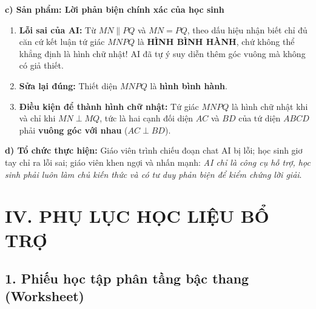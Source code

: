 \documentclass[12pt, a4paper]{article}
\begin{document}
\noindent \textbf{c) Sản phẩm: Lời phản biện chính xác của học sinh}
\begin{enumerate}[leftmargin=0.6cm]
    \item \textbf{Lỗi sai của AI:} Từ $MN \parallel PQ$ và $MN = PQ$, theo dấu hiệu nhận biết chỉ đủ căn cứ kết luận tứ giác $MNPQ$ là \textbf{HÌNH BÌNH HÀNH}, chứ không thể khẳng định là hình chữ nhật! AI đã tự ý suy diễn thêm góc vuông mà không có giả thiết.
    \item \textbf{Sửa lại đúng:} Thiết diện $MNPQ$ là \textbf{hình bình hành}.
    \item \textbf{Điều kiện để thành hình chữ nhật:} Tứ giác $MNPQ$ là hình chữ nhật khi và chỉ khi $MN \perp MQ$, tức là hai cạnh đối diện $AC$ và $BD$ của tứ diện $ABCD$ phải \textbf{vuông góc với nhau} ($AC \perp BD$).
\end{enumerate}

\noindent \textbf{d) Tổ chức thực hiện:}
Giáo viên trình chiếu đoạn chat AI bị lỗi; học sinh giơ tay chỉ ra lỗi sai; giáo viên khen ngợi và nhấn mạnh: \textit{AI chỉ là công cụ hỗ trợ, học sinh phải luôn làm chủ kiến thức và có tư duy phản biện để kiểm chứng lời giải}.

\section*{IV. PHỤ LỤC HỌC LIỆU BỔ TRỢ}

\subsection*{1. Phiếu học tập phân tầng bậc thang (Worksheet)}
\end{document}
